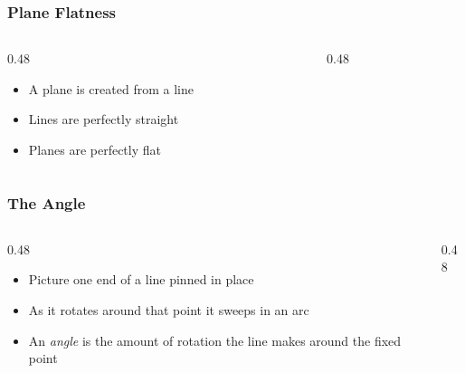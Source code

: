 \begin{frame}
	\frametitle{Plane Flatness}

    \begin{columns}
        \begin{column}{0.48\linewidth}
            \begin{itemize}[<+- | alert@+>]
                \item A plane is created from a line
                \item Lines are perfectly straight
                \item Planes are perfectly flat
            \end{itemize}
        \end{column}
        \begin{column}{0.48\linewidth}
            \centering
            \resizebox{\linewidth}{!}{
                
            }
        \end{column}
    \end{columns}
\end{frame}

\begin{frame}
	\frametitle{The Angle}

    \begin{columns}
        \begin{column}{0.48\linewidth}
            \begin{itemize}[<+- | alert@+>]
                \item Picture one end of a line pinned in place
                \item As it rotates around that point it sweeps in an arc
                \item An \emph{angle} is the amount of rotation the line makes around the fixed point
            \end{itemize}
        \end{column}
        \begin{column}{0.48\linewidth}
            \centering
            \resizebox{\linewidth}{!}{
                
            }
        \end{column}
    \end{columns}
\end{frame}

